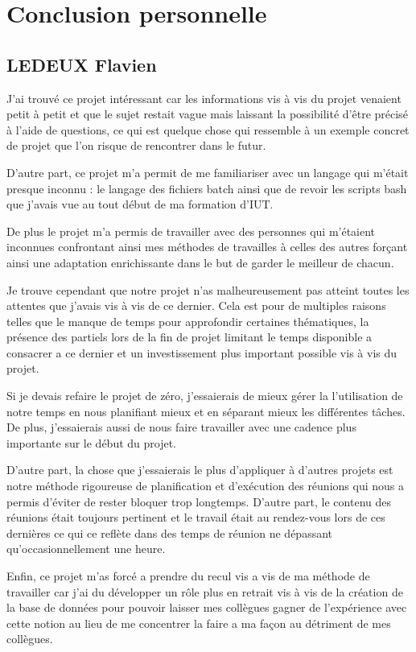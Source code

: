 \section{Conclusion personnelle }
\subsection{LEDEUX Flavien}
J'ai trouvé ce projet intéressant car les informations vis à vis du projet venaient petit à petit et que le sujet restait vague mais laissant la possibilité d'être précisé à l'aide de questions, ce qui est quelque chose qui ressemble à un exemple concret de projet que l'on risque de rencontrer dans le futur.

D'autre part, ce projet m'a permit de me familiariser avec un langage qui m'était presque inconnu : le langage des fichiers batch ainsi que de revoir les scripts bash que j'avais vue au tout début de ma formation d'IUT.

De plus le projet m'a permis de travailler avec des personnes qui m'étaient inconnues confrontant ainsi mes méthodes de travailles à celles des autres forçant ainsi une adaptation enrichissante dans le but de garder le meilleur de chacun.

Je trouve cependant que notre projet n'as malheureusement pas atteint toutes les attentes que j'avais vis à vis de ce dernier. Cela est pour de multiples raisons telles que le manque de temps pour approfondir certaines thématiques, la présence des partiels lors de la fin de projet limitant le temps disponible a consacrer a ce dernier et un investissement plus important possible vis à vis du projet.   

Si je devais refaire le projet de zéro, j'essaierais de mieux gérer la l'utilisation de notre temps en nous planifiant mieux et en séparant mieux les différentes tâches. 
De plus, j'essaierais aussi de nous faire travailler avec une cadence plus importante sur le début du projet.

D'autre part, la chose que j'essaierais le plus d'appliquer à d'autres projets est notre méthode rigoureuse de planification et d'exécution des réunions qui nous a permis d'éviter de rester bloquer trop longtemps.
D'autre part, le contenu des réunions était toujours pertinent et le travail était au rendez-vous lors de ces dernières ce qui ce reflète dans des temps de réunion ne dépassant qu'occasionnellement une heure.

Enfin, ce projet m'as forcé a prendre du recul vis a vis de ma méthode de travailler car j'ai du développer un rôle plus en retrait vis à vis de la création de la base de données pour pouvoir laisser mes collègues gagner de l'expérience avec cette notion au lieu de me concentrer la faire a ma façon au détriment de mes collègues.

